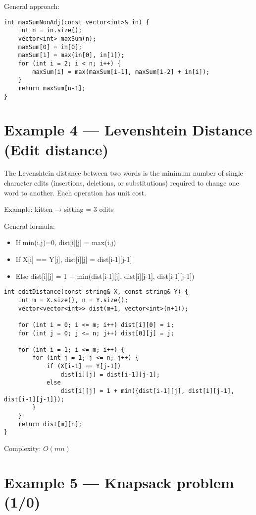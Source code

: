 \documentclass{article}
\begin{document}
General approach:

\begin{lstlisting}[style=cppstyle]
int maxSumNonAdj(const vector<int>& in) {
    int n = in.size();
    vector<int> maxSum(n);
    maxSum[0] = in[0];
    maxSum[1] = max(in[0], in[1]);
    for (int i = 2; i < n; i++) {
        maxSum[i] = max(maxSum[i-1], maxSum[i-2] + in[i]);
    }
    return maxSum[n-1];
}
\end{lstlisting}

\section{Example 4 — Levenshtein Distance (Edit distance)}

The Levenshtein distance between two words is the minimum number of single character edits (insertions, deletions, or substitutions) required to change one word to another. Each operation has unit cost.

Example: kitten → sitting = 3 edits

General formula:

\begin{itemize}
    \item If min(i,j)=0, dist[i][j] = max(i,j)
    \item If X[i] == Y[j], dist[i][j] = dist[i-1][j-1]
    \item Else dist[i][j] = 1 + min(dist[i-1][j], dist[i][j-1], dist[i-1][j-1])
\end{itemize}

\begin{lstlisting}[style=cppstyle]
int editDistance(const string& X, const string& Y) {
    int m = X.size(), n = Y.size();
    vector<vector<int>> dist(m+1, vector<int>(n+1));

    for (int i = 0; i <= m; i++) dist[i][0] = i;
    for (int j = 0; j <= n; j++) dist[0][j] = j;

    for (int i = 1; i <= m; i++) {
        for (int j = 1; j <= n; j++) {
            if (X[i-1] == Y[j-1])
                dist[i][j] = dist[i-1][j-1];
            else
                dist[i][j] = 1 + min({dist[i-1][j], dist[i][j-1], dist[i-1][j-1]});
        }
    }
    return dist[m][n];
}
\end{lstlisting}

Complexity: \(O(mn)\)

\section{Example 5 — Knapsack problem (1/0)}
\end{document}
